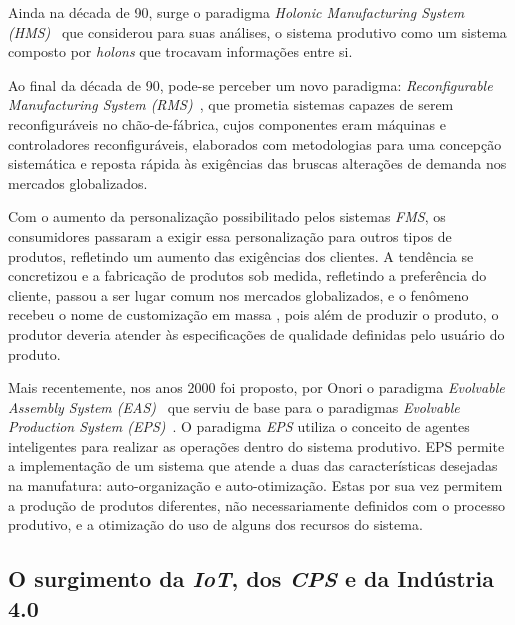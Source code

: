 Ainda na década de 90, surge o paradigma \textit{Holonic Manufacturing System (HMS)}~\cite{CHRISTENSEN1994,VANBRUSSEL1998}  que considerou para suas análises, o sistema produtivo como um sistema composto por \textit{holons} que trocavam informações entre si. 

Ao final da década de 90, pode-se perceber um novo paradigma: \textit{Reconfigurable Manufacturing System (RMS)}~\cite{KOREN1999}, que prometia sistemas capazes de serem reconfiguráveis no chão-de-fábrica, cujos componentes eram máquinas e controladores reconfiguráveis, elaborados com metodologias para uma concepção sistemática e reposta rápida às exigências das bruscas alterações de demanda nos mercados globalizados.
 
Com o aumento da personalização possibilitado pelos sistemas \textit{FMS}, os consumidores passaram a exigir essa personalização para outros tipos de produtos, refletindo um aumento das exigências dos clientes. A tendência se concretizou e a fabricação de produtos sob medida, refletindo a preferência do cliente, passou a ser lugar comum nos mercados globalizados, e o fenômeno recebeu o nome de customização em massa \cite{DAVIS1997}, pois além de produzir o produto, o produtor deveria atender às especificações de qualidade definidas pelo usuário do produto. 

Mais recentemente, nos anos 2000 foi proposto, por Onori o paradigma \textit{Evolvable Assembly System (EAS)}~\cite{ONORI2002,FREI2006} que serviu de base para o paradigmas \textit{Evolvable Production System (EPS)}~\cite{ONORI2010}. O paradigma \textit{EPS} utiliza o conceito de agentes inteligentes para realizar as operações dentro do sistema produtivo. EPS permite a implementação de um sistema que atende a duas das características desejadas na manufatura: auto-organização e auto-otimização. Estas por sua vez permitem a produção de produtos diferentes, não necessariamente definidos com o processo produtivo, e a otimização do uso de alguns dos recursos do sistema.




\subsection{O surgimento da \textit{IoT}, dos \textit{CPS} e da Indústria 4.0 }	


